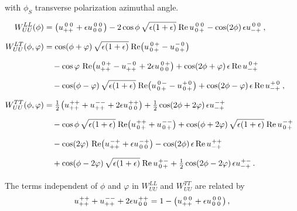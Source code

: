 \documentclass[12pt]{article}
\newcommand{\ms}{\mskip 1.5mu}
\newcommand{\re}{\operatorname{Re}}
\newcommand{\ru}[4]{u^{\ms #1 #2}_{#3 #4}}
\newcommand{\0}{{\mskip 2.5mu} 0 {\mskip 2.5mu}}
\begin{document}
with $\phi_S$ transverse polarization azimuthal angle. 
%
\begin{align}
  \label{WUU}
W_{UU}^{LL}(\phi) &=
  \bigl( \ru{\0}{\0}{+}{+} + \epsilon \ru{\0}{\0}{\0}{\0} \bigr)
  - 2\cos\phi\, \sqrt{\epsilon (1+\epsilon)}\ms \re\ru{\0}{\0}{\0}{+}
  - \cos(2\phi)\, \epsilon \ru{\0}{\0}{-}{+} \,,
  \phantom{\frac{1}{2}}
\nonumber \\
%
W_{UU}^{LT}(\phi,\varphi) &=
  \cos(\phi + \varphi)\, \sqrt{\epsilon (1+\epsilon)}\ms
  \re\bigl( \ru{\0}{+}{\0}{+} - \ru{-}{\0}{\0}{+} \bigr)
  \phantom{\frac{1}{2}}
\nonumber \\
& \quad{}
  - \cos\varphi\,
  \re\bigl( \ru{\0}{+}{+}{+} - \ru{-}{\0}{+}{+}
          + 2\epsilon \ru{\0}{+}{\0}{\0} \bigr)
  + \cos(2\phi + \varphi)\, \epsilon \re\ru{\0}{+}{-}{+}
  \phantom{\frac{1}{2}}
\nonumber \\
& \quad{}
  - \cos(\phi - \varphi)\, \sqrt{\epsilon (1+\epsilon)}\ms
    \re\bigl( \ru{\0}{-}{\0}{+} - \ru{+}{\0}{\0}{+} \bigr)
  + \cos(2\phi - \varphi)\, \epsilon \re\ru{+}{\0}{-}{+} \,,
  \phantom{\frac{1}{2}}
\nonumber \\
%
W_{UU}^{TT}(\phi,\varphi) &=
  \tfrac{1}{2}\ms \bigl( \ru{+}{+}{+}{+} + \ru{-}{-}{+}{+}
                      + 2\epsilon \ru{+}{+}{\0}{\0} \bigr)
  + \tfrac{1}{2} \cos(2\phi + 2\varphi)\, \epsilon \ru{-}{+}{-}{+}
  \phantom{\frac{1}{2}}
\nonumber \\
& \quad{}
  - \cos\phi\, \sqrt{\epsilon (1+\epsilon)}\ms
    \re\bigl( \ru{+}{+}{\0}{+} + \ru{-}{-}{\0}{+} \bigr)
  + \cos(\phi + 2\varphi)\, \sqrt{\epsilon (1+\epsilon)}\ms
    \re\ru{-}{+}{\0}{+}
  \phantom{\frac{1}{2}}
\nonumber \\
& \quad{}
  - \cos(2\varphi)\,
    \re\bigl( \ru{-}{+}{+}{+} + \epsilon \ru{-}{+}{\0}{\0} \bigr)
  - \cos(2\phi)\, \epsilon \re\ru{+}{+}{-}{+}
  \phantom{\frac{1}{2}}
\nonumber \\
& \quad{}
  + \cos(\phi - 2\varphi)\, \sqrt{\epsilon (1+\epsilon)}\ms
    \re\ru{+}{-}{\0}{+}
  + \tfrac{1}{2} \cos(2\phi - 2\varphi)\, \epsilon \ru{+}{-}{-}{+} \,.
  \phantom{\frac{1}{2}}
\end{align}

The terms independent of $\phi$ and $\varphi$ in $W_{UU}^{LL}$ and
$W_{UU}^{TT}$ are related by
\begin{equation}
  \label{norm-rel}
\ru{+}{+}{+}{+} + \ru{-}{-}{+}{+} + 2\epsilon \ru{+}{+}{\0}{\0}
= 1 - 
  \bigl( \ru{\0}{\0}{+}{+} + \epsilon \ru{\0}{\0}{\0}{\0} \bigr) \,,
\end{equation}
\end{document}
